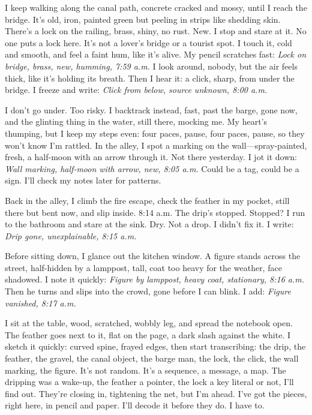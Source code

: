 \documentclass{article}
\begin{document}
I keep walking along the canal path, concrete cracked and mossy, until I reach the bridge. It's old, iron, painted green but peeling in strips like shedding skin. There's a lock on the railing, brass, shiny, no rust. New. I stop and stare at it. No one puts a lock here. It's not a lover's bridge or a tourist spot. I touch it, cold and smooth, and feel a faint hum, like it's alive. My pencil scratches fast: \textit{Lock on bridge, brass, new, humming, 7:59 a.m.} I look around, nobody, but the air feels thick, like it's holding its breath. Then I hear it: a click, sharp, from under the bridge. I freeze and write: \textit{Click from below, source unknown, 8:00 a.m.}

I don't go under. Too risky. I backtrack instead, fast, past the barge, gone now, and the glinting thing in the water, still there, mocking me. My heart's thumping, but I keep my steps even: four paces, pause, four paces, pause, so they won't know I'm rattled. In the alley, I spot a marking on the wall—spray-painted, fresh, a half-moon with an arrow through it. Not there yesterday. I jot it down: \textit{Wall marking, half-moon with arrow, new, 8:05 a.m.} Could be a tag, could be a sign. I'll check my notes later for patterns.

Back in the alley, I climb the fire escape, check the feather in my pocket, still there but bent now, and slip inside. 8:14 a.m. The drip's stopped. Stopped? I run to the bathroom and stare at the sink. Dry. Not a drop. I didn't fix it. I write: \textit{Drip gone, unexplainable, 8:15 a.m.}

Before sitting down, I glance out the kitchen window. A figure stands across the street, half-hidden by a lamppost, tall, coat too heavy for the weather, face shadowed. I note it quickly: \textit{Figure by lamppost, heavy coat, stationary, 8:16 a.m.} Then he turns and slips into the crowd, gone before I can blink. I add: \textit{Figure vanished, 8:17 a.m.}

I sit at the table, wood, scratched, wobbly leg, and spread the notebook open. The feather goes next to it, flat on the page, a dark slash against the white. I sketch it quickly: curved spine, frayed edges, then start transcribing: the drip, the feather, the gravel, the canal object, the barge man, the lock, the click, the wall marking, the figure. It's not random. It's a sequence, a message, a map. The dripping was a wake-up, the feather a pointer, the lock a key literal or not, I'll find out. They're closing in, tightening the net, but I'm ahead. I've got the pieces, right here, in pencil and paper. I'll decode it before they do. I have to.
\end{document}
